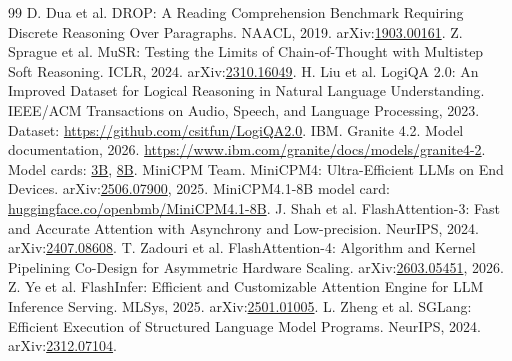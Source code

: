 \begin{thebibliography}{99}
 D. Dua et al. DROP: A Reading Comprehension Benchmark Requiring Discrete Reasoning Over Paragraphs. NAACL, 2019. arXiv:\href{https://arxiv.org/abs/1903.00161}{1903.00161}.
 Z. Sprague et al. MuSR: Testing the Limits of Chain-of-Thought with Multistep Soft Reasoning. ICLR, 2024. arXiv:\href{https://arxiv.org/abs/2310.16049}{2310.16049}.
 H. Liu et al. LogiQA 2.0: An Improved Dataset for Logical Reasoning in Natural Language Understanding. IEEE/ACM Transactions on Audio, Speech, and Language Processing, 2023. Dataset: \url{https://github.com/csitfun/LogiQA2.0}.
 IBM. Granite 4.2. Model documentation, 2026. \url{https://www.ibm.com/granite/docs/models/granite4-2}. Model cards: \href{https://huggingface.co/ibm-granite/granite-4.2-3b}{3B}, \href{https://huggingface.co/ibm-granite/granite-4.2-8b}{8B}.
 MiniCPM Team. MiniCPM4: Ultra-Efficient LLMs on End Devices. arXiv:\href{https://arxiv.org/abs/2506.07900}{2506.07900}, 2025. MiniCPM4.1-8B model card: \href{https://huggingface.co/openbmb/MiniCPM4.1-8B}{huggingface.co/openbmb/MiniCPM4.1-8B}.
 J. Shah et al. FlashAttention-3: Fast and Accurate Attention with Asynchrony and Low-precision. NeurIPS, 2024. arXiv:\href{https://arxiv.org/abs/2407.08608}{2407.08608}.
 T. Zadouri et al. FlashAttention-4: Algorithm and Kernel Pipelining Co-Design for Asymmetric Hardware Scaling. arXiv:\href{https://arxiv.org/abs/2603.05451}{2603.05451}, 2026.
 Z. Ye et al. FlashInfer: Efficient and Customizable Attention Engine for LLM Inference Serving. MLSys, 2025. arXiv:\href{https://arxiv.org/abs/2501.01005}{2501.01005}.
 L. Zheng et al. SGLang: Efficient Execution of Structured Language Model Programs. NeurIPS, 2024. arXiv:\href{https://arxiv.org/abs/2312.07104}{2312.07104}.
\end{thebibliography}
\endgroup
